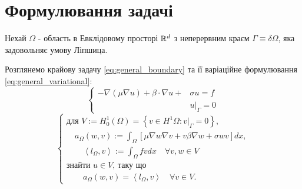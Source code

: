 \clearpage
\section{Формулювання задачі}

Нехай $\Omega$ - область в Евклідовому просторі $\mathbb{R}^d$ з неперервним краєм $\Gamma \equiv \delta \Omega$, яка задовольняє умову Ліпшица.

Розглянемо крайову задачу \eqref{eq:general_boundary} та її варіаційне формулювання \eqref{eq:general_variational}:
%
\begin{equation}\label{eq:general_boundary}
	\begin{cases}
			- \nabla (\mu \nabla u) + \beta \cdot \nabla u + &\sigma u = f  \\
			&u|_\Gamma = 0
	\end{cases}
\end{equation}
%
\begin{equation}\label{eq:general_variational}
	\begin{cases}
		\mbox{для } V := H_0^1 \left( \Omega \right) =
		\left\lbrace
			v \in H^1 \Omega : v|_\Gamma = 0
		\right\rbrace, \\

		\quad a_\Omega(w,v) := \displaystyle\int_\Omega
		\left[
			\mu \nabla w \nabla v +v \beta \nabla w + \sigma wv
		\right] dx, \\

		\qquad \left\langle l_\Omega, v \right\rangle := \displaystyle\int_\Omega fvdx \quad \forall v,w \in V \\

		\mbox{знайти }u \in V \mbox{, таку що} \\

		\qquad a_\Omega(w,v) = \left\langle l_\Omega, v \right\rangle \quad \forall v \in V.

	\end{cases}
\end{equation}

